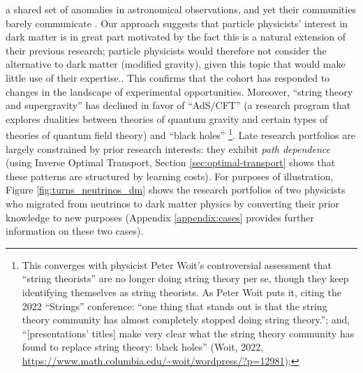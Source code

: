 \documentclass{article}
\begin{document}
{a shared set of anomalies in astronomical observations, and yet their communities barely communicate \citep{Martens2023,martens2022integrating}. Our approach suggests that particle physicists' interest in dark matter is in great part motivated by the fact this is a natural extension of their previous research; particle physicists would therefore not consider the alternative to dark matter (modified gravity), given this topic that would make little use of their expertise.}. This confirms that the cohort has responded to changes in the landscape of experimental opportunities. Moreover, ``string theory and supergravity'' has declined in favor of ``AdS/CFT'' (a research program that explores dualities between theories of quantum gravity and certain types of theories of quantum field theory) and ``black holes'' \footnote{This converges with physicist Peter Woit's controversial assessment that ``string theorists'' are no longer doing string theory per se, though they keep identifying themselves as string theorists. As Peter Woit puts it, citing the 2022 ``Strings'' conference: ``one thing that stands out is that the string theory community has almost completely stopped doing string theory.''; and, ``[presentations' titles] make very clear what the string theory community has found to replace string theory: black holes'' (Woit, 2022, \url{https://www.math.columbia.edu/~woit/wordpress/?p=12981});}. Late research portfolios are largely constrained by prior research interests: they exhibit \textit{path dependence} \citep{Galesic2023} (using Inverse Optimal Transport, Section \ref{sec:optimal-transport} shows that these patterns are structured by learning costs). For purposes of illustration, Figure \ref{fig:turns_neutrinos_dm} shows the research portfolios of two physicists who migrated from neutrinos to dark matter physics by converting their prior knowledge to new purposes (Appendix \ref{appendix:cases} provides further information on these two cases).

\end{document}
